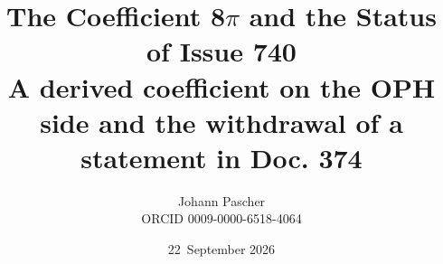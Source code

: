 \documentclass[11pt,a4paper]{report}
\title{The Coefficient 8$\pi$ and the Status of Issue 740\\[0.5em]\large A derived coefficient on the OPH side and the withdrawal of a statement in Doc. 374}
\date{22~September 2026}
\author{Johann Pascher\\\small ORCID 0009-0000-6518-4064}
\begin{document}
\renewcommand{\thechapter}{}
\renewcommand{\thesection}{\arabic{section}}
\maketitle
\tableofcontents

\end{document}
